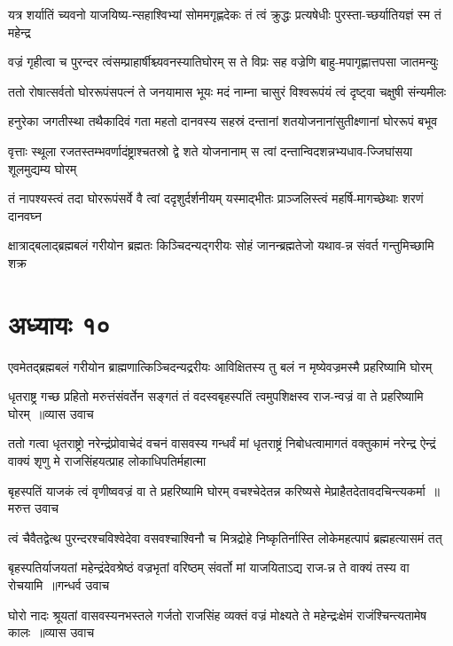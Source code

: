 \twolineshloka
{यत्र शर्यातिं च्यवनो याजयिष्य-न्सहाश्विभ्यां सोममगृह्णदेकः}
{तं त्वं क्रुद्धः प्रत्यषेधीः पुरस्ता-च्छर्यातियज्ञं स्म तं महेन्द्र}


\twolineshloka
{वज्रं गृहीत्वा च पुरन्दर त्वंसम्प्राहार्षीश्च्यवनस्यातिघोरम्}
{स ते विप्रः सह वज्रेणि बाहु-मपागृह्णात्तपसा जातमन्युः}


\twolineshloka
{ततो रोषात्सर्वतो घोररूपंसपत्नं ते जनयामास भूयः}
{मदं नाम्ना चासुरं विश्वरूपंयं त्वं दृष्ट्वा चक्षुषी संन्यमीलः}


\twolineshloka
{हनुरेका जगतीस्था तथैकादिवं गता महतो दानवस्य}
{सहस्रं दन्तानां शतयोजनानांसुतीक्ष्णानां घोररूपं बभूव}


\twolineshloka
{वृत्ताः स्थूला रजतस्तम्भवर्णादंष्ट्राश्चतस्रो द्वे शते योजनानाम्}
{स त्वां दन्तान्विदशन्नभ्यधाव-ज्जिघांसया शूलमुद्यम्य घोरम्}


\twolineshloka
{तं नापश्यस्त्वं तदा घोररूपंसर्वे वै त्वां ददृशुर्दर्शनीयम्}
{यस्माद्भीतः प्राञ्जलिस्त्वं महर्षि-मागच्छेथाः शरणं दानवघ्न}


\twolineshloka
{क्षात्राद्बलाद्ब्रह्मबलं गरीयोन ब्रह्मतः किञ्चिदन्यद्गरीयः}
{सोहं जानन्ब्रह्मतेजो यथाव-न्न संवर्त गन्तुमिच्छामि शक्र}


\chapter{अध्यायः १०}
\twolineshloka
{एवमेतद्ब्रह्मबलं गरीयोन ब्राह्मणात्किञ्चिदन्यद्ररीयः}
{आविक्षितस्य तु बलं न मृष्येवज्रमस्मै प्रहरिष्यामि घोरम्}


\twolineshloka
{धृतराष्ट्र गच्छ प्रहितो मरुत्तंसंवर्तेन सङ्गतं तं वदस्वबृहस्पतिं त्वमुपशिक्षस्व राज-न्वज्रं वा ते प्रहरिष्यामि घोरम् ॥व्यास उवाच}
{}


ततो गत्वा धृतराष्ट्रो नरेन्द्रंप्रोवाचेदं वचनं वासवस्य
\twolineshloka
{गन्धर्वं मां धृतराष्ट्रं निबोधत्वामागतं वक्तुकामं नरेन्द्र}
{ऐन्द्रं वाक्यं शृणु मे राजसिंहयत्प्राह लोकाधिपतिर्महात्मा}


\threelineshloka
{बृहस्पतिं याजकं त्वं वृणीष्ववज्रं वा ते प्रहरिष्यामि घोरम्}
{वचश्चेदेतन्न करिष्यसे मेप्राहैतदेतावदचिन्त्यकर्मा ॥मरुत्त उवाच}
{}


\twolineshloka
{त्वं चैवैतद्वेत्थ पुरन्दरश्चविश्वेदेवा वसवश्चाश्विनौ च}
{मित्रद्रोहे निष्कृतिर्नास्ति लोकेमहत्पापं ब्रह्महत्यासमं तत्}


\threelineshloka
{बृहस्पतिर्याजयतां महेन्द्रंदेवश्रेष्ठं वज्रभृतां वरिष्ठम्}
{संवर्तो मां याजयिताऽद्य राज-न्न ते वाक्यं तस्य वा रोचयामि ॥गन्धर्व उवाच}
{}


\threelineshloka
{घोरो नादः श्रूयतां वासवस्यनभस्तले गर्जतो राजसिंह}
{व्यक्तं वज्रं मोक्ष्यते ते महेन्द्रःक्षेमं राजंश्चिन्त्यतामेष कालः ॥व्यास उवाच}
{}


